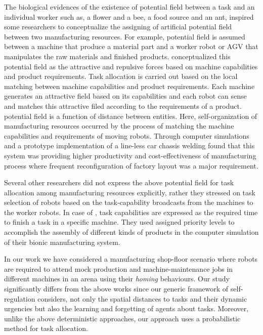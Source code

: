 \documentclass[smallcondensed]{svjour3}
\begin{document}
The biological evidences of the existence of potential field between a task and an individual worker such as, a flower and a bee, a food source and an ant, inspired some researchers to conceptualize the assigning of artificial potential field between two manufacturing resources. For example, potential field is assumed between a machine that produce a material part and a worker robot or AGV that manipulates the raw materials and finished products. \cite{Ueda2006} conceptualized this potential field as the attractive and repulsive forces based on machine capabilities and product requirements. Task allocation is carried out based on the local matching between machine capabilities and product requirements. Each machine generates an attractive field based on its capabilities and each robot can sense and matches this attractive filed according to the requirements of a product. potential field is a function of distance between entities. Here, self-organization of manufacturing resources occurred by the process of matching the machine capabilities and requirements of moving robots. Through computer simulations and a prototype implementation of a line-less car chassis welding \cite{Ueda2006} found that this system was providing higher productivity and cost-effectiveness of manufacturing process where frequent reconfiguration of factory layout was a major requirement. 

Several other researchers did not express the above potential field for task allocation among manufacturing resources explicitly, rather they stressed on task selection of robots based on the task-capability broadcasts from the machines to the worker robots. In case of \cite{Lazinica+2007}, task capabilities are expressed as the required time to finish a task in a specific machine. They used assigned priority levels to accomplish the assembly of different kinds of products in the computer simulation of their bionic manufacturing system. 

In our work we have considered a manufacturing shop-floor scenario where robots are required to attend mock production and machine-maintenance jobs in different machines in an arena using their {\em homing} behaviours. Our study significantly differs from the above works since our generic framework of self-regulation considers, not only the spatial distances to tasks and their dynamic urgencies but also the learning and forgetting of agents about tasks. Moreover, unlike the above deterministic approaches, our approach uses a probabilistic method for task allocation.
\end{document}
